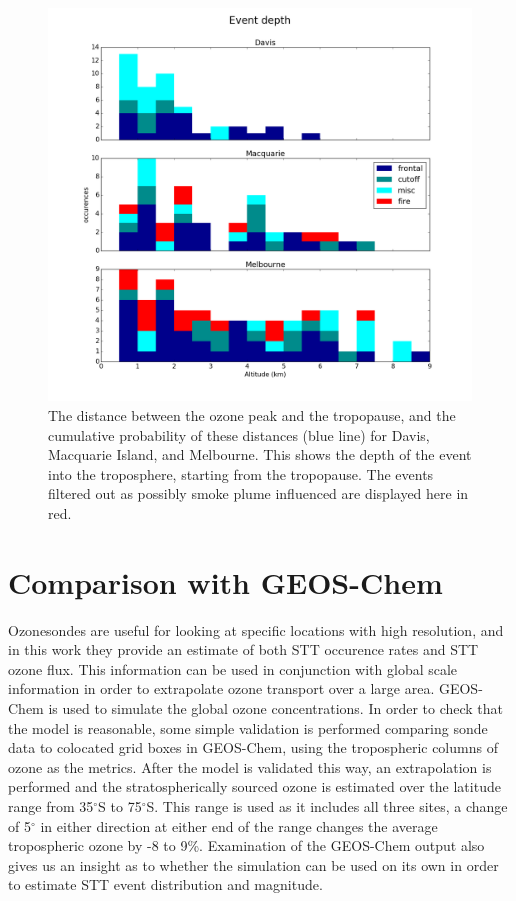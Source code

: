 \documentclass{article}
\begin{document}
  \begin{figure}[!htbp]
    \begin{center}
    \includegraphics[width=0.99\columnwidth]{figures/summary_depth.png}
    \caption{The distance between the ozone peak and the tropopause, and the cumulative probability of these distances (blue line) for Davis, Macquarie Island, and Melbourne.
    This shows the depth of the event into the troposphere, starting from the tropopause.
    The events filtered out as possibly smoke plume influenced are displayed here in red.}
    \label{fig:SummaryTPDepths}
    \end{center}
  \end{figure}

\section{Comparison with GEOS-Chem}
  
  Ozonesondes are useful for looking at specific locations with high resolution, and in this work they provide an estimate of both STT occurence rates and STT ozone flux.
  This information can be used in conjunction with global scale information in order to extrapolate ozone transport over a large area.
  GEOS-Chem is used to simulate the global ozone concentrations.
  In order to check that the model is reasonable, some simple validation is performed comparing sonde data to colocated grid boxes in GEOS-Chem, using the tropospheric columns of ozone as the metrics.
  After the model is validated this way, an extrapolation is performed and the stratospherically sourced ozone is estimated over the latitude range from 35$^{\circ}$S to 75$^{\circ}$S.
  This range is used as it includes all three sites, a change of 5$^{\circ}$ in either direction at either end of the range changes the average tropospheric ozone by -8 to 9\%.
  Examination of the GEOS-Chem output also gives us an insight as to whether the simulation can be used on its own in order to estimate STT event distribution and magnitude.
\end{document}

